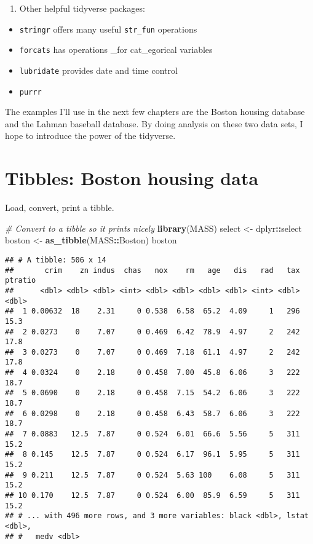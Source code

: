 \documentclass[]{book}
\newenvironment{Shaded}{\begin{snugshade}}{\end{snugshade}}
\newcommand{\KeywordTok}[1]{\textcolor[rgb]{0.13,0.29,0.53}{\textbf{#1}}}
\newcommand{\StringTok}[1]{\textcolor[rgb]{0.31,0.60,0.02}{#1}}
\newcommand{\CommentTok}[1]{\textcolor[rgb]{0.56,0.35,0.01}{\textit{#1}}}
\newcommand{\OperatorTok}[1]{\textcolor[rgb]{0.81,0.36,0.00}{\textbf{#1}}}
\newcommand{\NormalTok}[1]{#1}
\providecommand{\tightlist}{%
  \setlength{\itemsep}{0pt}\setlength{\parskip}{0pt}}
\begin{document}
\begin{enumerate}
\def\labelenumi{\arabic{enumi}.}
\setcounter{enumi}{6}
\tightlist
\item
  Other helpful tidyverse packages:
\end{enumerate}

\begin{itemize}
\tightlist
\item
  \texttt{stringr} offers many useful \texttt{str\_fun} operations
\item
  \texttt{forcats} has operations \_for cat\_egorical variables
\item
  \texttt{lubridate} provides date and time control
\item
  \texttt{purrr}
\end{itemize}

The examples I'll use in the next few chapters are the Boston housing
database and the Lahman baseball database. By doing analysis on these
two data sets, I hope to introduce the power of the tidyverse.

\section{Tibbles: Boston housing
data}\label{tibbles-boston-housing-data}

Load, convert, print a tibble.

\begin{Shaded}
\begin{Highlighting}[]
\CommentTok{# Convert to a tibble so it prints nicely}
\KeywordTok{library}\NormalTok{(MASS)}
\NormalTok{select <-}\StringTok{ }\NormalTok{dplyr}\OperatorTok{::}\NormalTok{select}
\NormalTok{boston <-}\StringTok{ }\KeywordTok{as_tibble}\NormalTok{(MASS}\OperatorTok{::}\NormalTok{Boston)}
\NormalTok{boston}
\end{Highlighting}
\end{Shaded}

\begin{verbatim}
## # A tibble: 506 x 14
##       crim    zn indus  chas   nox    rm   age   dis   rad   tax ptratio
##      <dbl> <dbl> <dbl> <int> <dbl> <dbl> <dbl> <dbl> <int> <dbl>   <dbl>
##  1 0.00632  18    2.31     0 0.538  6.58  65.2  4.09     1   296    15.3
##  2 0.0273    0    7.07     0 0.469  6.42  78.9  4.97     2   242    17.8
##  3 0.0273    0    7.07     0 0.469  7.18  61.1  4.97     2   242    17.8
##  4 0.0324    0    2.18     0 0.458  7.00  45.8  6.06     3   222    18.7
##  5 0.0690    0    2.18     0 0.458  7.15  54.2  6.06     3   222    18.7
##  6 0.0298    0    2.18     0 0.458  6.43  58.7  6.06     3   222    18.7
##  7 0.0883   12.5  7.87     0 0.524  6.01  66.6  5.56     5   311    15.2
##  8 0.145    12.5  7.87     0 0.524  6.17  96.1  5.95     5   311    15.2
##  9 0.211    12.5  7.87     0 0.524  5.63 100    6.08     5   311    15.2
## 10 0.170    12.5  7.87     0 0.524  6.00  85.9  6.59     5   311    15.2
## # ... with 496 more rows, and 3 more variables: black <dbl>, lstat <dbl>,
## #   medv <dbl>
\end{verbatim}
\end{document}
